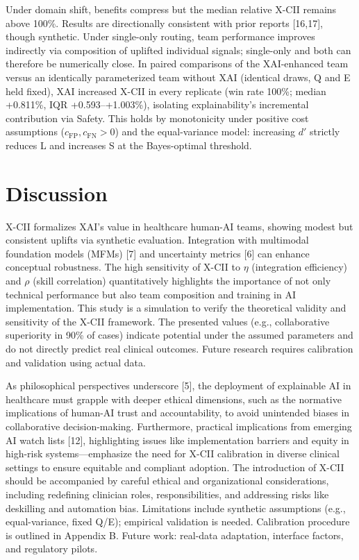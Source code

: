 \documentclass[11pt,a4paper]{article}
\begin{document}
Under domain shift, benefits compress but the median relative X-CII remains above 100\%. Results are directionally consistent with prior reports [16,17], though synthetic. Under single-only routing, team performance improves indirectly via composition of uplifted individual signals; single-only and both can therefore be numerically close. In paired comparisons of the XAI-enhanced team versus an identically parameterized team without XAI (identical draws, Q and E held fixed), XAI increased X-CII in every replicate (win rate 100\%; median +0.811\%, IQR +0.593--+1.003\%), isolating explainability's incremental contribution via Safety. This holds by monotonicity under positive cost assumptions ($c_{\text{FP}}, c_{\text{FN}} > 0$) and the equal-variance model: increasing $d'$ strictly reduces L and increases S at the Bayes-optimal threshold.
\section{Discussion}
X-CII formalizes XAI's value in healthcare human-AI teams, showing modest but consistent uplifts via synthetic evaluation. Integration with multimodal foundation models (MFMs) [7] and uncertainty metrics [6] can enhance conceptual robustness. The high sensitivity of X-CII to $\eta$ (integration efficiency) and $\rho$ (skill correlation) quantitatively highlights the importance of not only technical performance but also team composition and training in AI implementation. This study is a simulation to verify the theoretical validity and sensitivity of the X-CII framework. The presented values (e.g., collaborative superiority in 90\% of cases) indicate potential under the assumed parameters and do not directly predict real clinical outcomes. Future research requires calibration and validation using actual data.

As philosophical perspectives underscore [5], the deployment of explainable AI in healthcare must grapple with deeper ethical dimensions, such as the normative implications of human-AI trust and accountability, to avoid unintended biases in collaborative decision-making. Furthermore, practical implications from emerging AI watch lists [12], highlighting issues like implementation barriers and equity in high-risk systems---emphasize the need for X-CII calibration in diverse clinical settings to ensure equitable and compliant adoption. The introduction of X-CII should be accompanied by careful ethical and organizational considerations, including redefining clinician roles, responsibilities, and addressing risks like deskilling and automation bias. Limitations include synthetic assumptions (e.g., equal-variance, fixed Q/E); empirical validation is needed. Calibration procedure is outlined in Appendix B. Future work: real-data adaptation, interface factors, and regulatory pilots.
\end{document}
